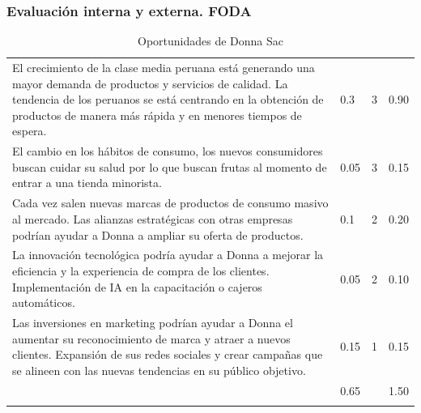 \subsubsection{Evaluación interna y externa. FODA}


	

\begin{longtable}{L{5cm} | C{2.5cm} | C{2.5cm} | C{2.5cm} }
	\hline
	 &   &  & \\
	\hline
	\endhead
	El crecimiento de la clase	media peruana está generando una mayor demanda de productos y servicios de calidad. La tendencia de los peruanos se está centrando en la obtención de productos de manera más rápida y en menores	tiempos de espera. & 0.3 & 3 &0.90\\
	\hline
	El cambio en los hábitos de consumo, los nuevos consumidores buscan cuidar su salud por lo que buscan frutas al momento de entrar a una tienda minorista. & 0.05 & 3 & 0.15\\
	\hline
	Cada vez salen nuevas marcas de productos de consumo masivo al mercado. Las alianzas estratégicas con otras empresas podrían ayudar a Donna a ampliar su oferta de productos. & 0.1 & 2 & 0.20\\
	\hline
	La innovación tecnológica podría ayudar a Donna  a mejorar la eficiencia y la experiencia de compra de los clientes. Implementación de IA en la capacitación o cajeros automáticos. & 0.05 & 2 & 0.10\\
	\hline
	Las inversiones en marketing podrían ayudar a Donna el aumentar su reconocimiento de marca y atraer a nuevos clientes. Expansión de sus redes sociales y crear campañas que se alineen con las nuevas tendencias en su público objetivo. & 0.15 & 1 & 0.15\\
	\hline
	 & 0.65 &  & 1.50\\
	\hline
	\caption{Oportunidades de Donna Sac}
	\label{tab:widgets}
\end{longtable}


